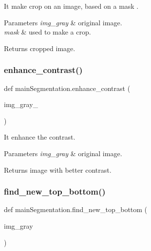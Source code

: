 It make crop on an image, based on a mask . 


\begin{DoxyParams}{Parameters}
{\em img\+\_\+gray} & original image. \\
\hline
{\em mask} & used to make a crop. \\
\hline
\end{DoxyParams}
\begin{DoxyReturn}{Returns}
cropped image. 
\end{DoxyReturn}
\mbox{\label{namespacemainSegmentation_ae53d80a4b6e1524938318ad5657e0fad}} 
\subsubsection{\texorpdfstring{enhance\+\_\+contrast()}{enhance\_contrast()}}
{\footnotesize\ttfamily def main\+Segmentation.\+enhance\+\_\+contrast (\begin{DoxyParamCaption}\item[{}]{img\+\_\+gray\+\_\+ }\end{DoxyParamCaption})}



It enhance the contrast. 


\begin{DoxyParams}{Parameters}
{\em img\+\_\+gray} & original image. \\
\hline
\end{DoxyParams}
\begin{DoxyReturn}{Returns}
image with better contrast. 
\end{DoxyReturn}
\mbox{\label{namespacemainSegmentation_a6f3887108c302153d5dc356b7f842709}} 
\subsubsection{\texorpdfstring{find\+\_\+new\+\_\+top\+\_\+bottom()}{find\_new\_top\_bottom()}}
{\footnotesize\ttfamily def main\+Segmentation.\+find\+\_\+new\+\_\+top\+\_\+bottom (\begin{DoxyParamCaption}\item[{}]{img\+\_\+gray }\end{DoxyParamCaption})}



